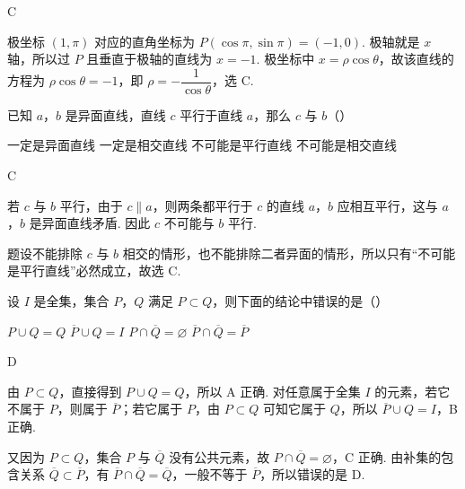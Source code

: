 \documentclass[UTF8,a4paper,oneside,11pt]{ctexbook}
\begin{document}
\begin{answer}
C
\end{answer}

\begin{solution}
极坐标 \((1,\pi)\) 对应的直角坐标为 \(P(\cos\pi,\sin\pi)=(-1,0)\). 极轴就是 \(x\) 轴，所以过 \(P\) 且垂直于极轴的直线为 \(x=-1\). 极坐标中 \(x=\rho\cos\theta\)，故该直线的方程为 \(\rho\cos\theta=-1\)，即 \(\rho=-\dfrac{1}{\cos\theta}\)，选 C.
\end{solution}

\begin{problem}
已知 \(a\)，\(b\) 是异面直线，直线 \(c\) 平行于直线 \(a\)，那么 \(c\) 与 \(b\)（\quad）

\choices
    {一定是异面直线}
    {一定是相交直线}
    {不可能是平行直线}
    {不可能是相交直线}
\end{problem}

\begin{answer}
C
\end{answer}

\begin{solution}
若 \(c\) 与 \(b\) 平行，由于 \(c\parallel a\)，则两条都平行于 \(c\) 的直线 \(a\)，\(b\) 应相互平行，这与 \(a\)，\(b\) 是异面直线矛盾. 因此 \(c\) 不可能与 \(b\) 平行.

题设不能排除 \(c\) 与 \(b\) 相交的情形，也不能排除二者异面的情形，所以只有“不可能是平行直线”必然成立，故选 C.
\end{solution}

\begin{problem}
设 \(I\) 是全集，集合 \(P\)，\(Q\) 满足 \(P \subset Q\)，则下面的结论中错误的是（\quad）

\choices
    {\(P \cup Q = Q\)}
    {\(\overline{P} \cup Q = I\)}
    {\(P \cap \overline{Q} = \varnothing\)}
    {\(\overline{P} \cap \overline{Q} = \overline{P}\)}
\end{problem}

\begin{answer}
D
\end{answer}

\begin{solution}
由 \(P\subset Q\)，直接得到 \(P\cup Q=Q\)，所以 A 正确. 对任意属于全集 \(I\) 的元素，若它不属于 \(P\)，则属于 \(\overline P\)；若它属于 \(P\)，由 \(P\subset Q\) 可知它属于 \(Q\)，所以 \(\overline P\cup Q=I\)，B 正确.

又因为 \(P\subset Q\)，集合 \(P\) 与 \(\overline Q\) 没有公共元素，故 \(P\cap\overline Q=\varnothing\)，C 正确. 由补集的包含关系 \(\overline Q\subset\overline P\)，有 \(\overline P\cap\overline Q=\overline Q\)，一般不等于 \(\overline P\)，所以错误的是 D.
\end{solution}
\end{document}
